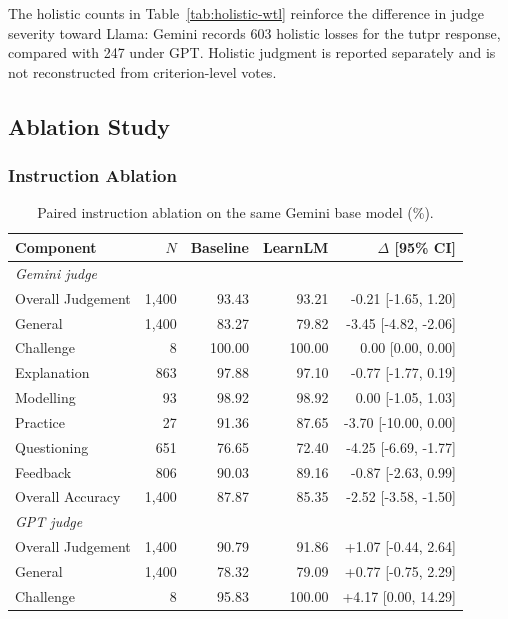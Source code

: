 \documentclass[conference]{IEEEtran}
\begin{document}
The holistic counts in Table~\ref{tab:holistic-wtl} reinforce the difference
in judge severity toward Llama: Gemini records 603 holistic losses for the
tutpr response, compared with 247 under GPT. Holistic judgment is reported
separately and is not reconstructed from criterion-level votes.

\subsection{Ablation Study}

\subsubsection{Instruction Ablation}

\begin{table}[t]
\caption{Paired instruction ablation on the same Gemini base model (\%).}
\label{tab:instruction-ablation}
\centering
\footnotesize
\setlength{\tabcolsep}{1.5pt}
\renewcommand{\arraystretch}{0.92}
\begin{tabular}{lrrrr}
\hline
Component & \(N\) & Baseline & LearnLM & \(\Delta\) [95\% CI] \\
\hline
\multicolumn{5}{l}{\textit{Gemini judge}} \\
Overall Judgement & 1,400 & 93.43 & 93.21 & -0.21 [-1.65, 1.20] \\
General & 1,400 & 83.27 & 79.82 & -3.45 [-4.82, -2.06] \\
Challenge & 8 & 100.00 & 100.00 & 0.00 [0.00, 0.00] \\
Explanation & 863 & 97.88 & 97.10 & -0.77 [-1.77, 0.19] \\
Modelling & 93 & 98.92 & 98.92 & 0.00 [-1.05, 1.03] \\
Practice & 27 & 91.36 & 87.65 & -3.70 [-10.00, 0.00] \\
Questioning & 651 & 76.65 & 72.40 & -4.25 [-6.69, -1.77] \\
Feedback & 806 & 90.03 & 89.16 & -0.87 [-2.63, 0.99] \\
Overall Accuracy & 1,400 & 87.87 & 85.35 & -2.52 [-3.58, -1.50] \\
\hline
\multicolumn{5}{l}{\textit{GPT judge}} \\
Overall Judgement & 1,400 & 90.79 & 91.86 & +1.07 [-0.44, 2.64] \\
General & 1,400 & 78.32 & 79.09 & +0.77 [-0.75, 2.29] \\
Challenge & 8 & 95.83 & 100.00 & +4.17 [0.00, 14.29] \\

\end{tabular}
\end{table}
\end{document}

